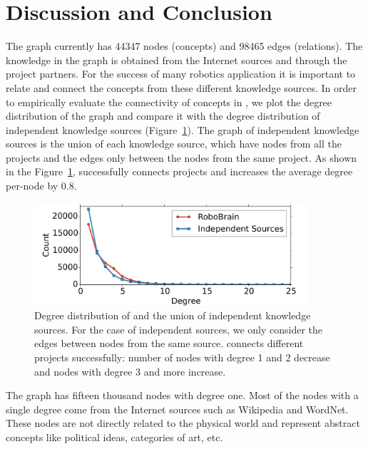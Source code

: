 \section{Discussion and Conclusion}
The \robobrain{} graph currently has 44347 nodes (concepts) and 98465 edges (relations). The knowledge in the graph is obtained from the Internet sources and through the \robobrain{} project partners. For the success of many robotics application it is important to relate and connect the concepts from these different knowledge sources. In order to empirically evaluate the connectivity of  concepts in \robobrain{}, we plot the degree distribution of the \robobrain{} graph and compare it with the degree distribution of independent knowledge sources (Figure~\ref{degDis}).
The graph of independent knowledge sources is the union of each knowledge source, which have nodes from all the projects and the edges only between the nodes from the same project.
As shown in the Figure~\ref{degDis}, \robobrain{} successfully connects projects and increases the average degree per-node by $0.8$.
\begin{figure}[h!]
 \includegraphics[width=\linewidth, height=1.5in]{Image/deg}
 \caption{Degree distribution of \robobrain{} and the union of independent knowledge sources.
 For the case of independent sources, we only consider the edges between nodes from the same
 source. \robobrain{} connects different projects successfully: number of nodes with degree 1 and 2 decrease and  nodes with degree 3 and more increase.}
\label{degDis}
\end{figure}
The \robobrain{} graph has fifteen thousand nodes with degree one. Most of the nodes with a single degree come from the Internet sources such as Wikipedia  and WordNet. These nodes are not directly related to the physical world and represent abstract concepts like political ideas, categories of art, etc.

